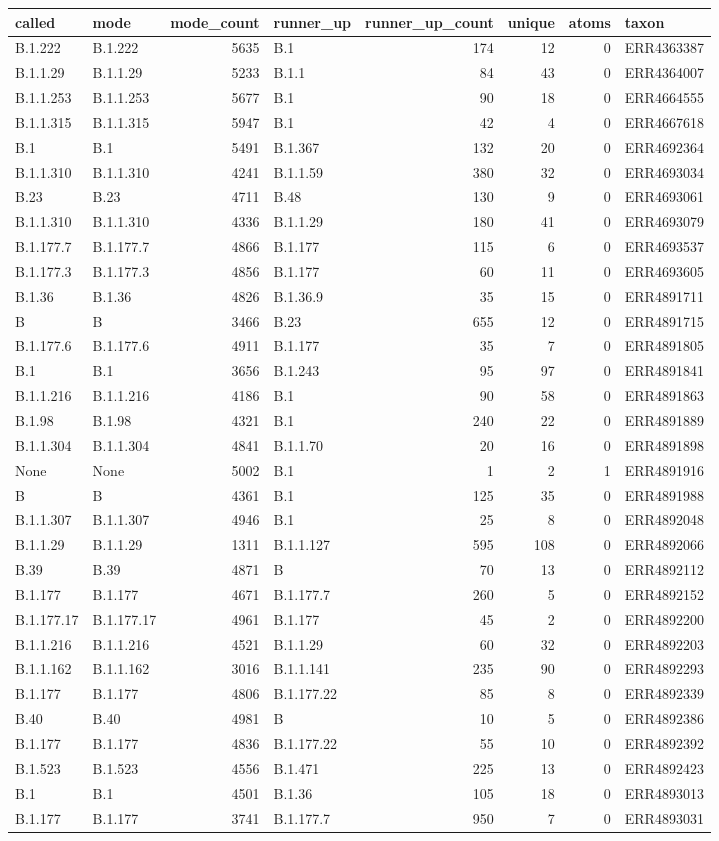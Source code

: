 \documentclass[
]{article}
\begin{document}
\begin{longtable}[]{@{}llrlrrrl@{}}
\toprule
called & mode & mode\_count & runner\_up & runner\_up\_count & unique &
atoms & taxon\tabularnewline
\midrule
\endhead
B.1.222 & B.1.222 & 5635 & B.1 & 174 & 12 & 0 &
ERR4363387\tabularnewline
B.1.1.29 & B.1.1.29 & 5233 & B.1.1 & 84 & 43 & 0 &
ERR4364007\tabularnewline
B.1.1.253 & B.1.1.253 & 5677 & B.1 & 90 & 18 & 0 &
ERR4664555\tabularnewline
B.1.1.315 & B.1.1.315 & 5947 & B.1 & 42 & 4 & 0 &
ERR4667618\tabularnewline
B.1 & B.1 & 5491 & B.1.367 & 132 & 20 & 0 & ERR4692364\tabularnewline
B.1.1.310 & B.1.1.310 & 4241 & B.1.1.59 & 380 & 32 & 0 &
ERR4693034\tabularnewline
B.23 & B.23 & 4711 & B.48 & 130 & 9 & 0 & ERR4693061\tabularnewline
B.1.1.310 & B.1.1.310 & 4336 & B.1.1.29 & 180 & 41 & 0 &
ERR4693079\tabularnewline
B.1.177.7 & B.1.177.7 & 4866 & B.1.177 & 115 & 6 & 0 &
ERR4693537\tabularnewline
B.1.177.3 & B.1.177.3 & 4856 & B.1.177 & 60 & 11 & 0 &
ERR4693605\tabularnewline
B.1.36 & B.1.36 & 4826 & B.1.36.9 & 35 & 15 & 0 &
ERR4891711\tabularnewline
B & B & 3466 & B.23 & 655 & 12 & 0 & ERR4891715\tabularnewline
B.1.177.6 & B.1.177.6 & 4911 & B.1.177 & 35 & 7 & 0 &
ERR4891805\tabularnewline
B.1 & B.1 & 3656 & B.1.243 & 95 & 97 & 0 & ERR4891841\tabularnewline
B.1.1.216 & B.1.1.216 & 4186 & B.1 & 90 & 58 & 0 &
ERR4891863\tabularnewline
B.1.98 & B.1.98 & 4321 & B.1 & 240 & 22 & 0 & ERR4891889\tabularnewline
B.1.1.304 & B.1.1.304 & 4841 & B.1.1.70 & 20 & 16 & 0 &
ERR4891898\tabularnewline
None & None & 5002 & B.1 & 1 & 2 & 1 & ERR4891916\tabularnewline
B & B & 4361 & B.1 & 125 & 35 & 0 & ERR4891988\tabularnewline
B.1.1.307 & B.1.1.307 & 4946 & B.1 & 25 & 8 & 0 &
ERR4892048\tabularnewline
B.1.1.29 & B.1.1.29 & 1311 & B.1.1.127 & 595 & 108 & 0 &
ERR4892066\tabularnewline
B.39 & B.39 & 4871 & B & 70 & 13 & 0 & ERR4892112\tabularnewline
B.1.177 & B.1.177 & 4671 & B.1.177.7 & 260 & 5 & 0 &
ERR4892152\tabularnewline
B.1.177.17 & B.1.177.17 & 4961 & B.1.177 & 45 & 2 & 0 &
ERR4892200\tabularnewline
B.1.1.216 & B.1.1.216 & 4521 & B.1.1.29 & 60 & 32 & 0 &
ERR4892203\tabularnewline
B.1.1.162 & B.1.1.162 & 3016 & B.1.1.141 & 235 & 90 & 0 &
ERR4892293\tabularnewline
B.1.177 & B.1.177 & 4806 & B.1.177.22 & 85 & 8 & 0 &
ERR4892339\tabularnewline
B.40 & B.40 & 4981 & B & 10 & 5 & 0 & ERR4892386\tabularnewline
B.1.177 & B.1.177 & 4836 & B.1.177.22 & 55 & 10 & 0 &
ERR4892392\tabularnewline
B.1.523 & B.1.523 & 4556 & B.1.471 & 225 & 13 & 0 &
ERR4892423\tabularnewline
B.1 & B.1 & 4501 & B.1.36 & 105 & 18 & 0 & ERR4893013\tabularnewline
B.1.177 & B.1.177 & 3741 & B.1.177.7 & 950 & 7 & 0 &
ERR4893031\tabularnewline

\end{longtable}
\end{document}
